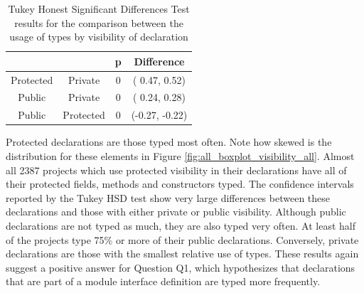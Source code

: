 \documentclass[msc]{ppgccufmg}
\renewcommand{\arraystretch}{1.2}
\begin{document}
\begin{table}[h]

\centering{}%
\renewcommand{\arraystretch}{1.2}

\caption{Tukey Honest Significant Differences Test results for the comparison between the usage of types by visibility of declaration}
\begin{tabular}{|c|c|c|c|}
\hline 
                & {}    & p   & Difference  \\
\hline
\hline
Protected & Private & 0 & ( 0.47,  0.52) \\ \hline
Public & Private & 0 & ( 0.24,  0.28) \\ \hline
Public & Protected & 0 & (-0.27, -0.22) \\ \hline
\end{tabular}
\label{tab:all_utest_visibility}
\end{table}

Protected declarations are those typed most often.
Note how skewed is the distribution for these elements in Figure \ref{fig:all_boxplot_visibility_all}.
Almost all 2387 projects which use protected visibility in their declarations have all of their protected fields, methods and constructors typed.
The confidence intervals reported by the Tukey HSD test show very large differences between these declarations and those with either private or public visibility.
Although public declarations are not typed as much, they are also typed very often.
At least half of the projects type 75\% or more of their public declarations.
Conversely, private declarations are those with the smallest relative use of types.
These results again suggest a positive answer for Question Q1, which hypothesizes that declarations that are part of a module interface definition are typed more frequently.
\end{document}
